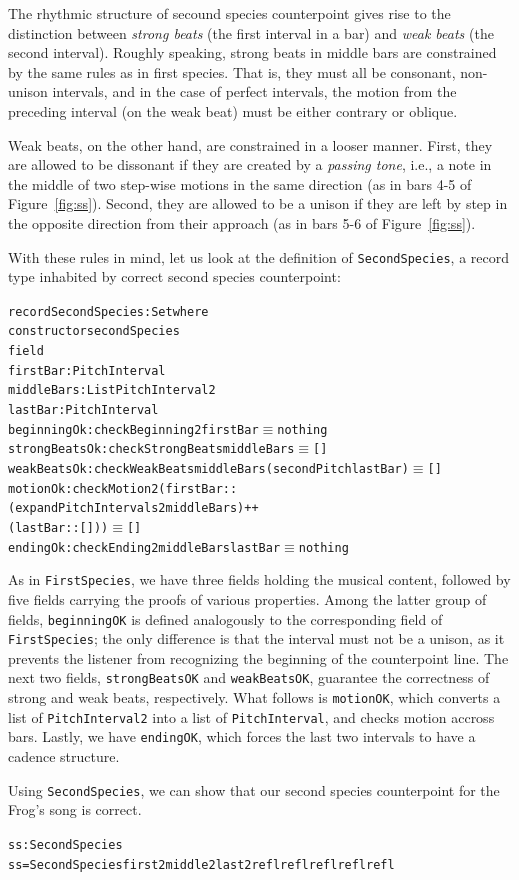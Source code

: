 The rhythmic structure of secound species counterpoint gives rise to
the distinction between \emph{strong beats} (the first interval in a bar)
and \emph{weak beats} (the second interval).
Roughly speaking, strong beats in middle bars are constrained by the
same rules as in first species.
That is, they must all be consonant, non-unison intervals, and in the 
case of perfect intervals, the motion from the preceding interval (on
the weak beat) must be either contrary or oblique.

Weak beats, on the other hand, are constrained in a looser manner.
First, they are allowed to be dissonant if they are created by a
\emph{passing tone}, i.e., a note in the middle of two step-wise
motions in the same direction (as in bars 4-5 of Figure~\ref{fig:ss}).
Second, they are allowed to be a unison if they are left by step in the
opposite direction from their approach (as in bars 5-6 of Figure~\ref{fig:ss}).

With these rules in mind, let us look at the definition of
\texttt{SecondSpecies}, a record type inhabited by correct second
species counterpoint:

\begin{alltt}
record SecondSpecies : Set where
  constructor secondSpecies
  field
    firstBar      : PitchInterval 
    middleBars    : List PitchInterval2
    lastBar       : PitchInterval 
    beginningOk   : checkBeginning2 firstBar \(\equiv\) nothing
    strongBeatsOk : checkStrongBeats middleBars \(\equiv\) []
    weakBeatsOk   : checkWeakBeats middleBars (secondPitch lastBar) \(\equiv\) []
    motionOk      : checkMotion2 (firstBar ::
                                  (expandPitchIntervals2 middleBars) ++
                                  (lastBar :: [])) \(\equiv\) []
    endingOk      : checkEnding2 middleBars lastBar \(\equiv\) nothing
\end{alltt}

\noindent As in \texttt{FirstSpecies}, we have three fields holding
the musical content, followed by five fields carrying the proofs of
various properties.
Among the latter group of fields, \texttt{beginningOK} is defined
analogously to the corresponding field of \texttt{FirstSpecies};
the only difference is that the interval must not be a unison,
as it prevents the listener from recognizing the beginning of the
counterpoint line.
The next two fields, \texttt{strongBeatsOK} and \texttt{weakBeatsOK},
guarantee the correctness of strong and weak beats, respectively.
What follows is \texttt{motionOK}, which converts a list of
\texttt{PitchInterval2} into a list of \texttt{PitchInterval}, and checks
motion accross bars.
Lastly, we have \texttt{endingOK}, which forces the last two intervals
to have a cadence structure.

Using \texttt{SecondSpecies}, we can show that our second species
counterpoint for the Frog's song is correct.

\begin{alltt}
ss : SecondSpecies
ss = SecondSpecies first2 middle2 last2 refl refl refl refl refl
\end{alltt}